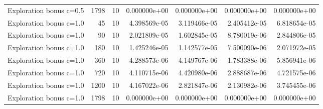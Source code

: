\begin{scriptsize}
\begin{longtable}{lrrrrrr}
Exploration bonus c=0.5 & 1798 & 10 & 0.000000e+00 & 0.000000e+00 & 0.000000e+00 & 0.000000e+00 \\
Exploration bonus c=1.0 & 45 & 10 & 4.398569e-05 & 3.119466e-05 & 2.405412e-05 & 6.818654e-05 \\
Exploration bonus c=1.0 & 90 & 10 & 2.021809e-05 & 1.602845e-05 & 8.780019e-06 & 2.844806e-05 \\
Exploration bonus c=1.0 & 180 & 10 & 1.425246e-05 & 1.142577e-05 & 7.500090e-06 & 2.071972e-05 \\
Exploration bonus c=1.0 & 360 & 10 & 4.288573e-06 & 4.149767e-06 & 1.783388e-06 & 5.856941e-06 \\
Exploration bonus c=1.0 & 720 & 10 & 4.110715e-06 & 4.420980e-06 & 2.888687e-06 & 4.721575e-06 \\
Exploration bonus c=1.0 & 1200 & 10 & 4.167022e-06 & 2.821847e-06 & 2.130982e-06 & 3.745455e-06 \\
Exploration bonus c=1.0 & 1798 & 10 & 0.000000e+00 & 0.000000e+00 & 0.000000e+00 & 0.000000e+00 \\
\bottomrule
\end{longtable}
\end{scriptsize}
